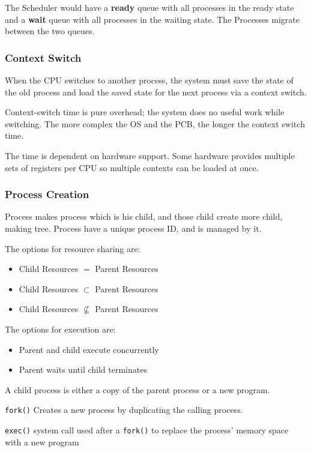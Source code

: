 \documentclass[]{article}
\begin{document}
The Scheduler would have a \textbf{ready} queue with all processes in the ready state and a \textbf{wait} queue with all processes in the waiting state. The Processes migrate between the two queues. 

\subsubsection*{Context Switch}

When the CPU switches to another process, the system must save the state of the old process and load the saved state for the next process via a context switch.

Context-switch time is pure overhead; the system does no useful work while switching. The more complex the OS and the PCB, the longer the context switch time.


The time is dependent on hardware support. Some hardware provides multiple sets of registers per CPU so multiple contexts can be loaded at once.

\subsubsection*{Process Creation}

Process makes process which is his child, and those child create more child, making tree.
Process have a unique process ID, and is managed by it.

The options for resource sharing are:
\begin{itemize}
    \item Child Resources $=$ Parent Resources
    \item Child Resources $\subset$ Parent Resources
    \item Child Resources $\nsubseteq$ Parent Resources 
\end{itemize}

The options for execution are:
\begin{itemize}
    \item Parent and child execute concurrently
    \item Parent waits until child terminates
\end{itemize}

A child process is either a copy of the parent process or a new program.

\verb|fork()| Creates a new process by duplicating the calling process. 

\verb|exec()| system call used after a \verb|fork()| to replace the process’ memory space with a new program
\end{document}
